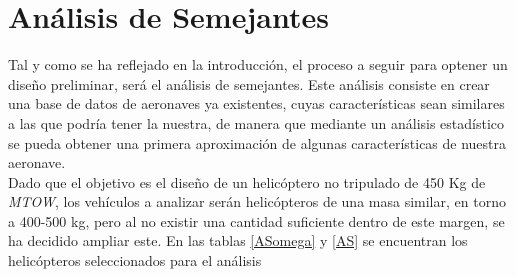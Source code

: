 \thispagestyle{empty}
\chapter{Análisis de Semejantes}

Tal y como se ha reflejado en la introducción, el proceso a seguir para optener un diseño preliminar, será el análisis de semejantes.
Este análisis consiste en crear una base de datos de aeronaves ya existentes, cuyas características sean similares a las que podría tener la nuestra, de manera que mediante un análisis estadístico se pueda obtener una primera aproximación de algunas características de nuestra aeronave.\\

Dado que el objetivo es el diseño de un helicóptero no tripulado de 450 Kg de \emph{MTOW}, los vehículos a analizar serán helicópteros de una masa similar, en torno a 400-500 kg, pero al no existir una cantidad suficiente dentro de este margen, se ha decidido ampliar este.
En las tablas \ref{ASomega} y \ref{AS} se encuentran los helicópteros seleccionados para el análisis

